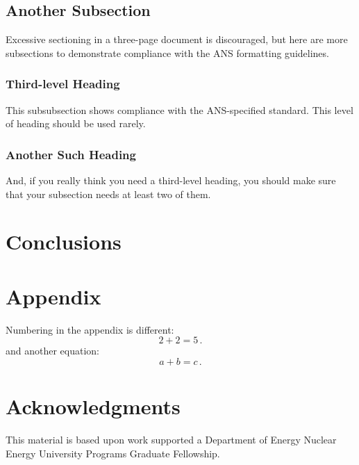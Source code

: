 \documentclass[twoside,a4paper,12pt,english,draft]{anstrans}
\begin{document}
\subsection{Another Subsection}
Excessive sectioning in a three-page document is discouraged, but here are more
subsections to demonstrate compliance with the ANS formatting guidelines.

\subsubsection{Third-level Heading}
This subsubsection shows compliance with the ANS-specified standard. This level
of heading should be used rarely.

\subsubsection{Another Such Heading}
And, if you really think you need a third-level heading, you should make sure
that your subsection needs at least two of them.

\section{Conclusions}

\appendix
\section{Appendix}

Numbering in the appendix is different:
\begin{equation} \label{eq:appendix}
  2 + 2 = 5\,.
\end{equation}
and another equation:
\begin{equation} \label{eq:appendix2}
  a + b = c\,.
\end{equation}

\section{Acknowledgments}
This material is based upon work supported a Department of Energy Nuclear
Energy University Programs Graduate Fellowship.


\end{document}
